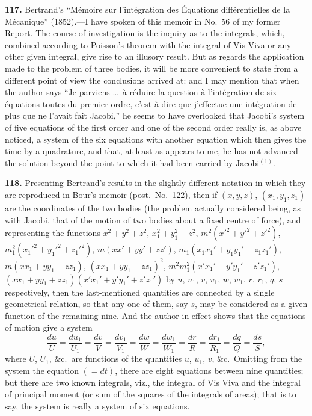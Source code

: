 \documentclass[11pt,a4paper]{book}
\begin{document}
\textbf{117.} Bertrand's ``M\'emoire sur l'int\'egration des \'Equations diff\'erentielles de la M\'ecanique'' (1852).---I have spoken of this memoir in No.~56 of my former Report. The course of investigation is the inquiry as to the integrals, which, combined according to Poisson's theorem with the integral of Vis Viva or any other given integral, give rise to an illusory result. But as regards the application made to the problem of three bodies, it will be more convenient to state from a different point of view the conclusions arrived at: and I may mention that when the author says ``Je parviens \dots\ \`a r\'eduire la question \`a l'int\'egration de six \'equations toutes du premier ordre, c'est-\`a-dire que j'effectue une int\'egration de plus que ne l'avait fait Jacobi,'' he seems to have overlooked that Jacobi's system of five equations of the first order and one of the second order really is, as above noticed, a system of the six equations with another equation which then gives the time by a quadrature, and that, at least as appears to me, he has not advanced the solution beyond the point to which it had been carried by Jacobi$^{(1)}$.


\textbf{118.} Presenting Bertrand's results in the slightly different notation in which they are reproduced in Bour's memoir (post.\ No.~122), then if $(x, y, z)$, $(x_1, y_1, z_1)$ are the coordinates of the two bodies (the problem actually considered being, as with Jacobi, that of the motion of two bodies about a fixed centre of force), and representing the functions $x^2 + y^2 + z^2$, $x_1^2 + y_1^2 + z_1^2$, $m^2(x'^2 + y'^2 + z'^2)$, $m_1^2(x_1'^2 + y_1'^2 + z_1'^2)$, $m(xx' + yy' + zz')$, $m_1(x_1x_1' + y_1y_1' + z_1z_1')$, $m(xx_1 + yy_1 + zz_1)$, $(xx_1 + yy_1 + zz_1)^2$, $m^2m_1^2(x'x_1' + y'y_1' + z'z_1')$, $(xx_1 + yy_1 + zz_1)(x'x_1' + y'y_1' + z'z_1')$ by $u$, $u_1$, $v$, $v_1$, $w$, $w_1$, $r$, $r_1$, $q$, $s$ respectively, then the last-mentioned quantities are connected by a single geometrical relation, so that any one of them, say $s$, may be considered as a given function of the remaining nine. And the author in effect shows that the equations of motion give a system
\[
\frac{du}{U} = \frac{du_1}{U_1} = \frac{dv}{V} = \frac{dv_1}{V_1} = \frac{dw}{W} = \frac{dw_1}{W_1} = \frac{dr}{R} = \frac{dr_1}{R_1} = \frac{dq}{Q} = \frac{ds}{S},
\]
where $U$, $U_1$, \&c.\ are functions of the quantities $u$, $u_1$, $v$, \&c.\ Omitting from the system the equation $(=dt)$, there are eight equations between nine quantities; but there are two known integrals, viz., the integral of Vis Viva and the integral of principal moment (or sum of the squares of the integrals of areas); that is to say, the system is really a system of six equations.
\end{document}
